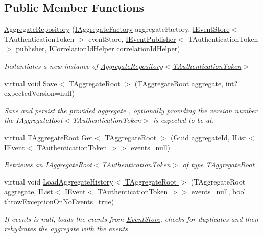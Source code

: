 \subsection*{Public Member Functions}
\begin{DoxyCompactItemize}
\item 
\hyperlink{classCqrs_1_1Domain_1_1AggregateRepository_ae4a6c96b10c536a0df6a381659f87744_ae4a6c96b10c536a0df6a381659f87744}{Aggregate\+Repository} (\hyperlink{interfaceCqrs_1_1Domain_1_1Factories_1_1IAggregateFactory}{I\+Aggregate\+Factory} aggregate\+Factory, \hyperlink{interfaceCqrs_1_1Events_1_1IEventStore}{I\+Event\+Store}$<$ T\+Authentication\+Token $>$ event\+Store, \hyperlink{interfaceCqrs_1_1Events_1_1IEventPublisher}{I\+Event\+Publisher}$<$ T\+Authentication\+Token $>$ publisher, I\+Correlation\+Id\+Helper correlation\+Id\+Helper)
\begin{DoxyCompactList}\small\item\em Instantiates a new instance of \hyperlink{classCqrs_1_1Domain_1_1AggregateRepository_ae4a6c96b10c536a0df6a381659f87744_ae4a6c96b10c536a0df6a381659f87744}{Aggregate\+Repository$<$\+T\+Authentication\+Token$>$} \end{DoxyCompactList}\item 
virtual void \hyperlink{classCqrs_1_1Domain_1_1AggregateRepository_aff9e828d19a091a4275f635bee4b3c9b_aff9e828d19a091a4275f635bee4b3c9b}{Save$<$ T\+Aggregate\+Root $>$} (T\+Aggregate\+Root aggregate, int? expected\+Version=null)
\begin{DoxyCompactList}\small\item\em Save and persist the provided {\itshape aggregate} , optionally providing the version number the I\+Aggregate\+Root$<$\+T\+Authentication\+Token$>$ is expected to be at. \end{DoxyCompactList}\item 
virtual T\+Aggregate\+Root \hyperlink{classCqrs_1_1Domain_1_1AggregateRepository_a0e55881812d463129df34189d29544b6_a0e55881812d463129df34189d29544b6}{Get$<$ T\+Aggregate\+Root $>$} (Guid aggregate\+Id, I\+List$<$ \hyperlink{interfaceCqrs_1_1Events_1_1IEvent}{I\+Event}$<$ T\+Authentication\+Token $>$$>$ events=null)
\begin{DoxyCompactList}\small\item\em Retrieves an I\+Aggregate\+Root$<$\+T\+Authentication\+Token$>$ of type {\itshape T\+Aggregate\+Root} . \end{DoxyCompactList}\item 
virtual void \hyperlink{classCqrs_1_1Domain_1_1AggregateRepository_af26efcb464ac989962a9ad138466e4d7_af26efcb464ac989962a9ad138466e4d7}{Load\+Aggregate\+History$<$ T\+Aggregate\+Root $>$} (T\+Aggregate\+Root aggregate, I\+List$<$ \hyperlink{interfaceCqrs_1_1Events_1_1IEvent}{I\+Event}$<$ T\+Authentication\+Token $>$$>$ events=null, bool throw\+Exception\+On\+No\+Events=true)
\begin{DoxyCompactList}\small\item\em If {\itshape events}  is null, loads the events from \hyperlink{namespaceCqrs_1_1EventStore}{Event\+Store}, checks for duplicates and then rehydrates the {\itshape aggregate}  with the events. \end{DoxyCompactList}\end{DoxyCompactItemize}
